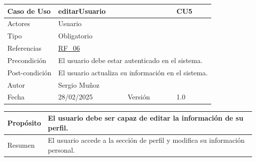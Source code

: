 \newpage

\begin{table}[H]
    \centering
    \begin{tabular}{| m{} | m{} | m{} | m{} |}
        \hline
        \rowcolor[HTML]{C0C0C0} Caso de Uso & \multicolumn{2}{|m{0.43\textwidth}|}{editarUsuario} &  CU5\\ 
        \hline
        Actores & \multicolumn{3}{l|}{Usuario} \\ 
        \hline
        Tipo & \multicolumn{3}{l|}{Obligatorio} \\ 
        \hline
        Referencias & \multicolumn{3}{l|}{\hyperref[req:RF06]{RF\_06}} \\ 
        \hline
        Precondición & \multicolumn{3}{l|}{El usuario debe estar autenticado en el sistema.} \\ 
        \hline
        Post-condición & \multicolumn{3}{l|}{El usuario actualiza su información en el sistema.} \\ 
        \hline
        Autor & \multicolumn{3}{l|}{Sergio Muñoz} \\ 
        \hline
        Fecha & 28/02/2025 & Versión & 1.0 \\ 
        \hline
    \end{tabular}
\end{table}

\begin{table}[H]
    \centering
    \begin{tabular}{| m{} | m{} | m{} | m{} |}
        \hline
        Propósito & \multicolumn{3}{m{0.67\textwidth}|}{El usuario debe ser capaz de editar la información de su perfil.} \\ 
        \hline
        Resumen & \multicolumn{3}{m{0.67\textwidth}|}{El usuario accede a la sección de perfil y modifica su información personal.} \\ 
        \hline
    \end{tabular}
\end{table}

